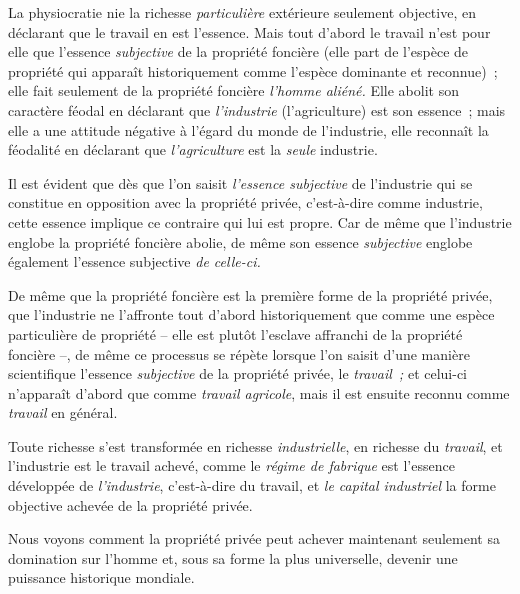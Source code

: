 \documentclass[french,twoside]{book} %
\begin{document}
La physiocratie nie la richesse \emph{particulière} extérieure seulement objective, en déclarant que le travail en est l’essence. Mais tout d’abord le travail n’est pour elle que l’essence \emph{subjective} de la propriété foncière (elle part de l’espèce de propriété qui apparaît historiquement comme l’espèce dominante et reconnue) ; elle fait seulement de la propriété foncière \emph{l’homme aliéné.} Elle abolit son caractère féodal en déclarant que \emph{l’industrie} (l’agriculture) est son essence ; mais elle a une attitude négative à l’égard du monde de l’industrie, elle reconnaît la féodalité en déclarant que \emph{l’agriculture} est la \emph{seule} industrie.\par
Il est évident que dès que l’on saisit \emph{l’essence subjective} de l’industrie qui se constitue en opposition avec la propriété privée, c’est-à-dire comme industrie, cette essence implique ce contraire qui lui est propre. Car de même que l’industrie englobe la propriété foncière abolie, de même son essence \emph{subjective} englobe également l’essence subjective \emph{de celle-ci.}\par
De même que la propriété foncière est la première forme de la propriété privée, que l’industrie ne l’affronte tout d’abord historiquement que comme une espèce particulière de propriété – elle est plutôt l’esclave affranchi de la propriété foncière –, de même ce processus se répète lorsque l’on saisit d’une manière scientifique l’essence \emph{subjective} de la propriété privée, le \emph{travail ;} et celui-ci n’apparaît d’abord que comme \emph{travail agricole}, mais il est ensuite reconnu comme \emph{travail} en général.\par
[III] Toute richesse s’est transformée en richesse \emph{industrielle}, en richesse du \emph{travail}, et l’industrie est le travail achevé, comme le \emph{régime de fabrique} est l’essence développée de \emph{l’industrie}, c’est-à-dire du travail, et \emph{le capital industriel} la forme objective achevée de la propriété privée.\par
Nous voyons comment la propriété privée peut achever maintenant seulement sa domination sur l’homme et, sous sa forme la plus universelle, devenir une puissance historique mondiale.
\end{document}
